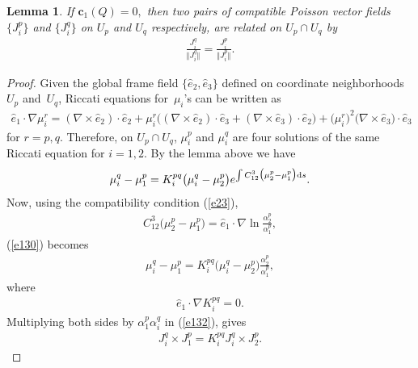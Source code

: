 \documentclass[10pt,a4paper]{amsart}
\numberwithin{equation}{section}
\newtheorem{Lemma}[Theorem]{Lemma}
\begin{document}
\begin{Lemma}\label{lemma4}
If $\boldsymbol{c}_{1}(Q) =0,$ then two pairs of compatible Poisson vector
fields $\big\{ J_{i}^{p}\big\} $ and $\big\{ J_{i}^{q}\big\} $ on $U_{p}$ and $U_{q}$ respectively, are related on $U_{p}\cap U_{q}$ by
\begin{gather*}
\frac{J_{i}^{q}}{\big\Vert J_{i}^{q}\big\Vert }=\frac{J_{i}^{p}}{\big\Vert J_{i}^{p}\big\Vert }.
\end{gather*}
\end{Lemma}

\begin{proof}Given the global frame f\/ield $\{ \widehat{e}_{2},\widehat{e}_{3}\} $ def\/ined on coordinate neighbor\-hoods~$U_{p}$ and~$U_{q}$, Riccati equations for~$\mu _{i}$'s can be written as
\begin{gather*}
\widehat{e}_{1}\cdot \nabla \mu _{i}^{r}=( \nabla \times \widehat{e}_{2}) \cdot \widehat{e}_{2}+\mu _{i}^{r}\big(( \nabla \times \widehat{e}_{2}) \cdot \widehat{e}_{3}+( \nabla \times \widehat{e}_{3}) \cdot \widehat{e}_{2}\big) +\big( \mu_{i}^{r}\big)^{2} \big(\nabla \times \widehat{e}_{3} \big) \cdot
\widehat{e}_{3}
\end{gather*}
for $r=p,q$. Therefore, on $U_{p}\cap U_{q}$, $\mu _{i}^{p}$ and $\mu_{i}^{q} $ are four solutions of the same Riccati equation for $i=1,2$. By the lemma above we have
\begin{gather}
\mu _{i}^{q}-\mu _{1}^{p}=K_{i}^{pq}\big( \mu _{i}^{q}-\mu _{2}^{p}\big) e^{\int C_{12}^{3}\big( \mu _{2}^{p}-\mu _{1}^{p}\big) {\rm d}s}. \label{e130}
\end{gather}
Now, using the compatibility condition (\ref{e23}),
\begin{gather*}
C_{12}^{3}\big( \mu _{2}^{p}-\mu _{1}^{p}\big) =\widehat{e}_{1}\cdot\nabla \ln \frac{\alpha _{2}^{p}}{\alpha _{1}^{p}},
\end{gather*}
(\ref{e130}) becomes
\begin{gather}
\mu _{i}^{q}-\mu _{1}^{p}=K_{i}^{pq}\big( \mu _{i}^{q}-\mu _{2}^{p}\big) \frac{\alpha _{2}^{p}}{\alpha _{1}^{p}}, \label{e132}
\end{gather}
where
\begin{gather}
\widehat{e}_{1}\cdot \nabla K_{i}^{pq}=0. \label{e133}
\end{gather}
Multiplying both sides by $\alpha _{1}^{p}\alpha _{i}^{q}$ in (\ref{e132}), gives
\begin{gather}
J_{i}^{q}\times J_{1}^{p}=K_{i}^{pq}J_{i}^{q}\times J_{2}^{p}. \label{e135}
\end{gather}

\end{proof}
\end{document}
